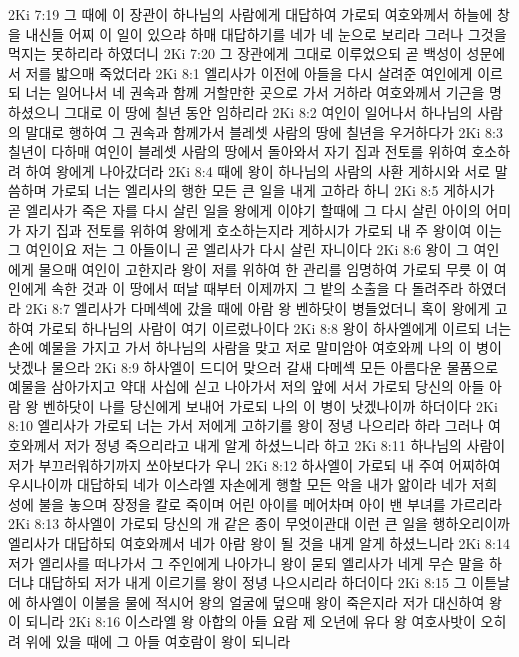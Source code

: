 2Ki 7:19  그 때에 이 장관이 하나님의 사람에게 대답하여 가로되 여호와께서 하늘에 창을 내신들 어찌 이 일이 있으랴 하매 대답하기를 네가 네 눈으로 보리라 그러나 그것을 먹지는 못하리라 하였더니
2Ki 7:20  그 장관에게 그대로 이루었으되 곧 백성이 성문에서 저를 밟으매 죽었더라
2Ki 8:1  엘리사가 이전에 아들을 다시 살려준 여인에게 이르되 너는 일어나서 네 권속과 함께 거할만한 곳으로 가서 거하라 여호와께서 기근을 명하셨으니 그대로 이 땅에 칠년 동안 임하리라
2Ki 8:2  여인이 일어나서 하나님의 사람의 말대로 행하여 그 권속과 함께가서 블레셋 사람의 땅에 칠년을 우거하다가
2Ki 8:3  칠년이 다하매 여인이 블레셋 사람의 땅에서 돌아와서 자기 집과 전토를 위하여 호소하려 하여 왕에게 나아갔더라
2Ki 8:4  때에 왕이 하나님의 사람의 사환 게하시와 서로 말씀하며 가로되 너는 엘리사의 행한 모든 큰 일을 내게 고하라 하니
2Ki 8:5  게하시가 곧 엘리사가 죽은 자를 다시 살린 일을 왕에게 이야기 할때에 그 다시 살린 아이의 어미가 자기 집과 전토를 위하여 왕에게 호소하는지라 게하시가 가로되 내 주 왕이여 이는 그 여인이요 저는 그 아들이니 곧 엘리사가 다시 살린 자니이다
2Ki 8:6  왕이 그 여인에게 물으매 여인이 고한지라 왕이 저를 위하여 한 관리를 임명하여 가로되 무릇 이 여인에게 속한 것과 이 땅에서 떠날 때부터 이제까지 그 밭의 소출을 다 돌려주라 하였더라
2Ki 8:7  엘리사가 다메섹에 갔을 때에 아람 왕 벤하닷이 병들었더니 혹이 왕에게 고하여 가로되 하나님의 사람이 여기 이르렀나이다
2Ki 8:8  왕이 하사엘에게 이르되 너는 손에 예물을 가지고 가서 하나님의 사람을 맞고 저로 말미암아 여호와께 나의 이 병이 낫겠나 물으라
2Ki 8:9  하사엘이 드디어 맞으러 갈새 다메섹 모든 아름다운 물품으로 예물을 삼아가지고 약대 사십에 싣고 나아가서 저의 앞에 서서 가로되 당신의 아들 아람 왕 벤하닷이 나를 당신에게 보내어 가로되 나의 이 병이 낫겠나이까 하더이다
2Ki 8:10  엘리사가 가로되 너는 가서 저에게 고하기를 왕이 정녕 나으리라 하라 그러나 여호와께서 저가 정녕 죽으리라고 내게 알게 하셨느니라 하고
2Ki 8:11  하나님의 사람이 저가 부끄러워하기까지 쏘아보다가 우니
2Ki 8:12  하사엘이 가로되 내 주여 어찌하여 우시나이까 대답하되 네가 이스라엘 자손에게 행할 모든 악을 내가 앎이라 네가 저희 성에 불을 놓으며 장정을 칼로 죽이며 어린 아이를 메어차며 아이 밴 부녀를 가르리라
2Ki 8:13  하사엘이 가로되 당신의 개 같은 종이 무엇이관대 이런 큰 일을 행하오리이까 엘리사가 대답하되 여호와께서 네가 아람 왕이 될 것을 내게 알게 하셨느니라
2Ki 8:14  저가 엘리사를 떠나가서 그 주인에게 나아가니 왕이 묻되 엘리사가 네게 무슨 말을 하더냐 대답하되 저가 내게 이르기를 왕이 정녕 나으시리라 하더이다
2Ki 8:15  그 이튿날에 하사엘이 이불을 물에 적시어 왕의 얼굴에 덮으매 왕이 죽은지라 저가 대신하여 왕이 되니라
2Ki 8:16  이스라엘 왕 아합의 아들 요람 제 오년에 유다 왕 여호사밧이 오히려 위에 있을 때에 그 아들 여호람이 왕이 되니라
